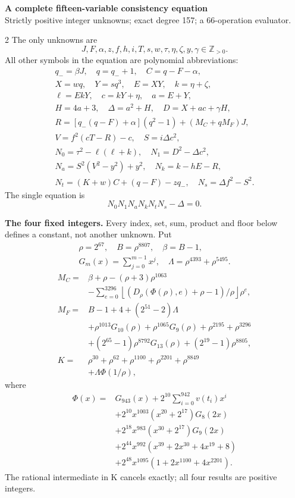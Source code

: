 \documentclass[10pt]{article}
\newcommand{\fl}[1]{\left\lfloor#1\right\rfloor}
\begin{document}
\begin{center}
{\large\bfseries A complete fifteen-variable consistency equation}\\[-1pt]
{\small Strictly positive integer unknowns; exact degree 157; a 66-operation evaluator.}
\end{center}\vspace{-8pt}
\begin{multicols}{2}
\fontsize{9}{9.5}\selectfont
The only unknowns are
\[
J,F,\alpha,z,f,h,i,T,s,w,\tau,\eta,\zeta,y,\gamma\in\mathbb Z_{>0}.
\]
All other symbols in the equation are polynomial abbreviations:
\[
\begin{gathered}
q_-=\beta J,\quad q=q_-+1,\quad C=q-F-\alpha,\\
X=wq,\quad Y=sq^3,\quad E=XY,\quad k=\eta+\zeta,\\
\ell=EkY,\quad c=kY+\eta,\quad a=E+Y,\\
H=4a+3,\quad\Delta=a^2+H,\quad D=X+ac+\gamma H,\\
R=[q_-(q-F)+\alpha](q^2-1)+(M_C+qM_F)J,\\
V=f^2(cT-R)-c,\quad S=i\Delta c^2,\\
N_0=\tau^2-\ell(\ell+k),\quad N_1=D^2-\Delta c^2,\\
N_a=S^2(V^2-y^2)+y^2,\quad N_k=k-hE-R,\\
N_t=(K+w)C+(q-F)-zq_-,\quad N_s=\Delta f^2-S^2.
\end{gathered}
\]
The single equation is
\[
\boxed{N_0N_1N_aN_kN_tN_s-\Delta=0.}
\]

\textbf{The four fixed integers.}
Every index, set, sum, product and floor below defines a constant, not
another unknown. Put
\[
\begin{gathered}
\rho=2^{67},\quad B=\rho^{8807},\quad\beta=B-1,\\
G_m(x)=\sum_{j=0}^{m-1}x^j,\quad
\Lambda=\rho^{4393}+\rho^{5495}.
\end{gathered}
\]
\begin{align*}
M_C={}&\beta+\rho-(\rho+3)\rho^{1063}\\
&-\sum_{e=0}^{3296}\fl{(D_\rho(\Phi(\rho),e)+\rho-1)/\rho}\rho^e,\\
M_F={}&B-1+4+(2^{51}-2)\Lambda\\
&+\rho^{1013}G_{10}(\rho)+\rho^{1065}G_9(\rho)
  +\rho^{2195}+\rho^{3296}\\
&+(2^{65}-1)\rho^{8792}G_{13}(\rho)+(2^{19}-1)\rho^{8805},\\
K={}&\rho^{30}+\rho^{62}+\rho^{1100}+\rho^{2201}+\rho^{8849}\\
&+\Lambda\Phi(1/\rho),
\end{align*}
where
\[
\begin{split}
\Phi(x)={}&G_{943}(x)+2^{10}\sum_{i=0}^{942}v(t_i)x^i\\
&+2^{10}x^{1003}(x^{20}+2^{17})G_8(2x)\\
&+2^{18}x^{983}(x^{30}+2^{17})G_9(2x)\\
&+2^{44}x^{992}(x^{39}+2x^{30}+4x^{19}+8)\\
&+2^{48}x^{1095}(1+2x^{1100}+4x^{2201}).
\end{split}
\]
The rational intermediate in K cancels exactly; all four results are positive integers.


\end{multicols}
\end{document}
